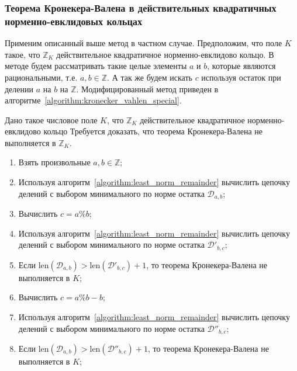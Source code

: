 \documentclass[_00_dissertation.tex]{subfiles}
\begin{document}
\subsubsection{Теорема Кронекера-Валена в действительных квадратичных норменно-евклидовых кольцах}

Применим описанный выше метод в частном случае.
Предположим, что поле $K$ такое, что $\mathbb{Z}_K$ действительное квадратичное норменно-евклидово кольцо.
В методе будем рассматривать такие целые элементы $a$ и $b$, которые являются рациональными, т.е. $a, b \in \mathbb{Z}$.
А так же будем искать $c$ используя остаток при делении $a$ на $b$ на $\mathbb{Z}$.
Модифицированный метод приведен в алгоритме~\ref{algorithm:kronecker_vahlen_special}.

\begin{algorithm}\label{algorithm:kronecker_vahlen_special}
    Дано такое числовое поле $K$, что $\mathbb{Z}_K$ действительное квадратичное норменно-евклидово кольцо
    Требуется доказать, что теорема Кронекера-Валена не выполняется в $\mathbb{Z}_K$.

    \begin{enumerate}
        \item Взять произвольные $a, b \in \mathbb{Z}$;

        \item Используя алгоритм~\ref{algorithm:least_norm_remainder} вычислить цепочку делений с выбором минимального по норме остатка $\mathcal{D}_{a,b}$;

        \item Вычислить $c = a \% b$;
        \item Используя алгоритм~\ref{algorithm:least_norm_remainder} вычислить цепочку делений с выбором минимального по норме остатка $\mathcal{D}'_{b,c}$;

        \item Если $\textrm{len}(\mathcal{D}_{a, b}) > \textrm{len}(\mathcal{D}'_{b, c}) + 1$, то теорема Кронекера-Валена не выполняется в $K$;

        \item Вычислить $c = a \% b - b$;

        \item Используя алгоритм~\ref{algorithm:least_norm_remainder} вычислить цепочку делений с выбором минимального по норме остатка $\mathcal{D}''_{b,c}$;

        \item Если $\textrm{len}(\mathcal{D}_{a, b}) > \textrm{len}(\mathcal{D}''_{b, c}) + 1$, то теорема Кронекера-Валена не выполняется в $K$;
    \end{enumerate}
\end{algorithm}
\end{document}
